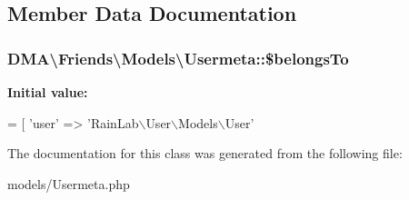 \subsection{Member Data Documentation}
\hypertarget{classDMA_1_1Friends_1_1Models_1_1Usermeta_a93ae6777a48086374de412273d1d092e}{
\subsubsection[{\$belongs\+To}]{\setlength{\rightskip}{0pt plus 5cm}D\+M\+A\textbackslash{}\+Friends\textbackslash{}\+Models\textbackslash{}\+Usermeta\+::\$belongs\+To}}\label{classDMA_1_1Friends_1_1Models_1_1Usermeta_a93ae6777a48086374de412273d1d092e}
{\bfseries Initial value\+:}
\begin{DoxyCode}
= [
        \textcolor{stringliteral}{'user'}  => \textcolor{stringliteral}{'RainLab\(\backslash\)User\(\backslash\)Models\(\backslash\)User'}
\end{DoxyCode}


The documentation for this class was generated from the following file\+:\begin{DoxyCompactItemize}
\item 
models/Usermeta.\+php\end{DoxyCompactItemize}
